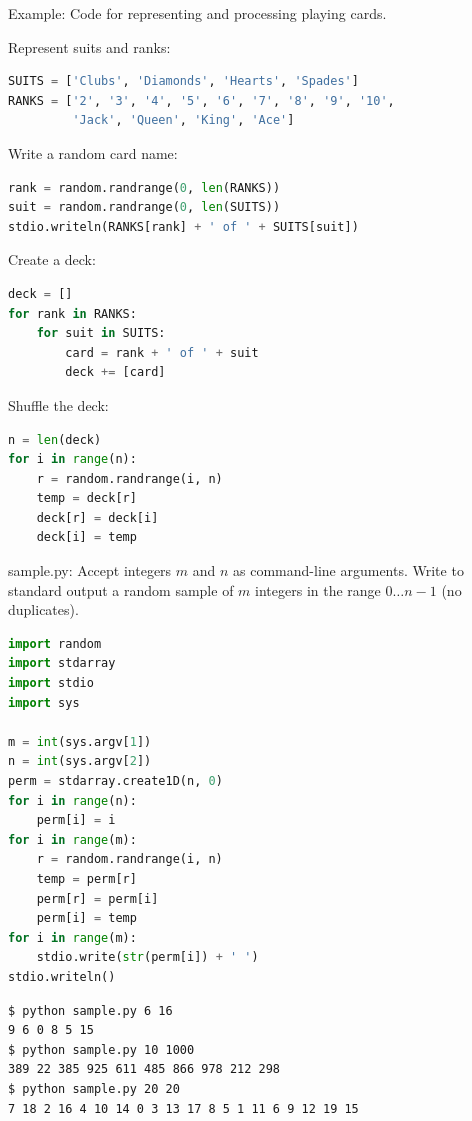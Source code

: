 \documentclass[8pt,a4paper,compress,handout]{beamer}
\begin{document}
\begin{frame}[fragile]
\begin{framed}
\tiny Example: Code for representing and processing playing cards.
\end{framed}

Represent suits and ranks:
\begin{lstlisting}[language=Python]
SUITS = ['Clubs', 'Diamonds', 'Hearts', 'Spades']
RANKS = ['2', '3', '4', '5', '6', '7', '8', '9', '10', 
         'Jack', 'Queen', 'King', 'Ace']
\end{lstlisting}

Write a random card name:
\begin{lstlisting}[language=Python]
rank = random.randrange(0, len(RANKS))
suit = random.randrange(0, len(SUITS))
stdio.writeln(RANKS[rank] + ' of ' + SUITS[suit])
\end{lstlisting}

Create a deck:
\begin{lstlisting}[language=Python]
deck = []
for rank in RANKS:
    for suit in SUITS:
        card = rank + ' of ' + suit
        deck += [card]
\end{lstlisting}

Shuffle the deck:
\begin{lstlisting}[language=Python]
n = len(deck)
for i in range(n):
    r = random.randrange(i, n)
    temp = deck[r]
    deck[r] = deck[i]
    deck[i] = temp
\end{lstlisting}
\end{frame}

\begin{frame}[fragile]
\begin{framed}
\tiny sample.py: Accept integers $m$ and $n$ as command-line arguments. Write to standard output a random sample of $m$ integers in the range $0 \dots n-1$ (no duplicates).
\end{framed}

\begin{lstlisting}[language=Python]
import random
import stdarray
import stdio
import sys

m = int(sys.argv[1])
n = int(sys.argv[2])
perm = stdarray.create1D(n, 0)
for i in range(n):
    perm[i] = i
for i in range(m):
    r = random.randrange(i, n)
    temp = perm[r]
    perm[r] = perm[i]
    perm[i] = temp
for i in range(m):
    stdio.write(str(perm[i]) + ' ')
stdio.writeln()
\end{lstlisting}

\begin{lstlisting}[language={}]
$ python sample.py 6 16
9 6 0 8 5 15 
$ python sample.py 10 1000
389 22 385 925 611 485 866 978 212 298 
$ python sample.py 20 20
7 18 2 16 4 10 14 0 3 13 17 8 5 1 11 6 9 12 19 15 
\end{lstlisting}
\end{frame}
\end{document}
